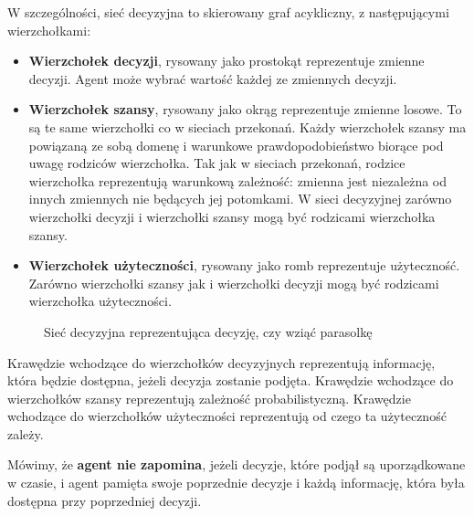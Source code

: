 \documentclass[a4paper, 12pt,oneside]{book}
\begin{document}
W szczególności, sieć decyzyjna to skierowany graf acykliczny, z następującymi
wierzchołkami:
\begin{itemize}
	\setlength\itemsep{-0.4em}
\item \textbf{Wierzchołek decyzji}, rysowany jako prostokąt reprezentuje
	zmienne decyzji. Agent może wybrać wartość każdej ze zmiennych decyzji.
\item \textbf{Wierzchołek szansy}, rysowany jako okrąg reprezentuje zmienne
	losowe. To są te same wierzchołki co w sieciach przekonań. Każdy
	wierzchołek szansy ma powiązaną ze sobą domenę i warunkowe
	prawdopodobieństwo biorące pod uwagę rodziców wierzchołka. Tak jak w
	sieciach przekonań, rodzice wierzchołka reprezentują warunkową
	zależność: zmienna jest niezależna od innych zmiennych nie będących jej
	potomkami. W sieci decyzyjnej zarówno wierzchołki decyzji i wierzchołki
	szansy mogą być rodzicami wierzchołka szansy.
\item \textbf{Wierzchołek użyteczności}, rysowany jako romb reprezentuje
	użyteczność. Zarówno wierzchołki szansy jak i wierzchołki decyzji mogą
	być rodzicami wierzchołka użyteczności.
\end{itemize}
\begin{figure}[!htb]
\begin{center}
\caption{Sieć decyzyjna reprezentująca decyzję, czy wziąć parasolkę}
\label{decision_network_umbrella}
\end{center}
\end{figure}
Krawędzie wchodzące do wierzchołków decyzyjnych reprezentują informację, która
będzie dostępna, jeżeli decyzja zostanie podjęta.
Krawędzie wchodzące do wierzchołków szansy reprezentują zależność
probabilistyczną.
Krawędzie wchodzące do wierzchołków użyteczności reprezentują od czego ta
użyteczność zależy.

Mówimy, że \textbf{agent nie zapomina}, jeżeli decyzje, które podjął są
uporządkowane w czasie, i agent pamięta swoje poprzednie decyzje i każdą
informację, która była dostępna przy poprzedniej decyzji.
\end{document}
